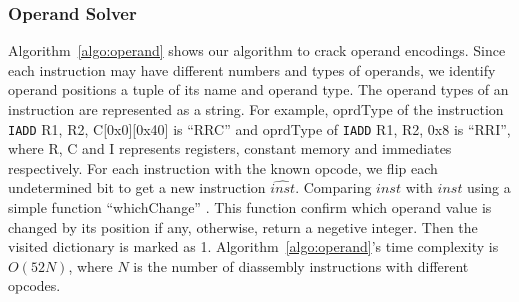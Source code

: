 
\subsubsection{Operand Solver}
Algorithm~\ref{algo:operand} shows our algorithm to crack operand encodings.
Since each instruction may have different numbers and types of operands, we identify operand positions a tuple of its name and operand type. 
The operand types of an instruction are represented as a string.
For example, oprdType of the instruction {\tt IADD} R1, R2, C[0x0][0x40] is ``RRC'' and oprdType of {\tt IADD} R1, R2, 0x8 is ``RRI'', where R, C and I represents registers, constant memory and immediates respectively.
For each instruction with the known opcode, we flip each undetermined bit to get a new instruction $\widehat{inst}$.
Comparing $inst$ with $\widehat{inst}$ using a simple function ``whichChange'' . This function confirm which operand value is changed by its position if any, otherwise, return a negetive integer.
Then the visited dictionary is marked as 1.
Algorithm~\ref{algo:operand}'s time complexity is $O(52N)$, where $N$ is the number of diassembly instructions with different opcodes.

